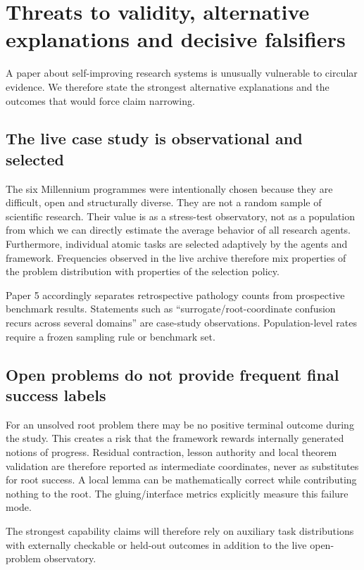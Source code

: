 \section{Threats to validity, alternative explanations and decisive falsifiers}
\label{sec:threats}

A paper about self-improving research systems is unusually vulnerable to circular evidence. We therefore state the strongest alternative explanations and the outcomes that would force claim narrowing.

\subsection{The live case study is observational and selected}

The six Millennium programmes were intentionally chosen because they are difficult, open and structurally diverse. They are not a random sample of scientific research. Their value is as a stress-test observatory, not as a population from which we can directly estimate the average behavior of all research agents. Furthermore, individual atomic tasks are selected adaptively by the agents and framework. Frequencies observed in the live archive therefore mix properties of the problem distribution with properties of the selection policy.

Paper 5 accordingly separates retrospective pathology counts from prospective benchmark results. Statements such as ``surrogate/root-coordinate confusion recurs across several domains'' are case-study observations. Population-level rates require a frozen sampling rule or benchmark set.

\subsection{Open problems do not provide frequent final success labels}

For an unsolved root problem there may be no positive terminal outcome during the study. This creates a risk that the framework rewards internally generated notions of progress. Residual contraction, lesson authority and local theorem validation are therefore reported as intermediate coordinates, never as substitutes for root success. A local lemma can be mathematically correct while contributing nothing to the root. The gluing/interface metrics explicitly measure this failure mode.

The strongest capability claims will therefore rely on auxiliary task distributions with externally checkable or held-out outcomes in addition to the live open-problem observatory.

